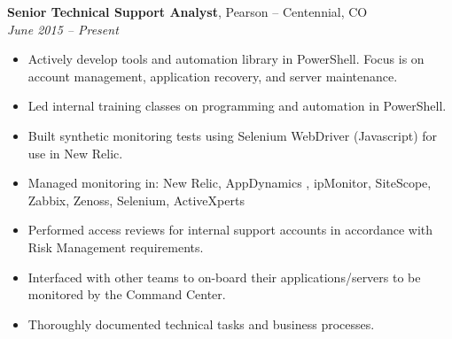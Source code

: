 {\bf Senior Technical Support Analyst}, Pearson -- Centennial, CO\\
{\it June 2015 – Present}
\begin{itemize}
	\item Actively develop tools and automation library in PowerShell. Focus is on account management, application recovery, and server maintenance.
	\item Led internal training classes on programming and automation in PowerShell.
	\item Built synthetic monitoring tests using Selenium WebDriver (Javascript) for use in New Relic.
	\item Managed monitoring in: New Relic, AppDynamics , ipMonitor, SiteScope, Zabbix, Zenoss, Selenium, ActiveXperts
	\item Performed access reviews for internal support accounts in accordance with Risk Management requirements.
	\item Interfaced with other teams to on-board their applications/servers to be monitored by the Command Center.
	\item Thoroughly documented technical tasks and business processes.
\end{itemize}